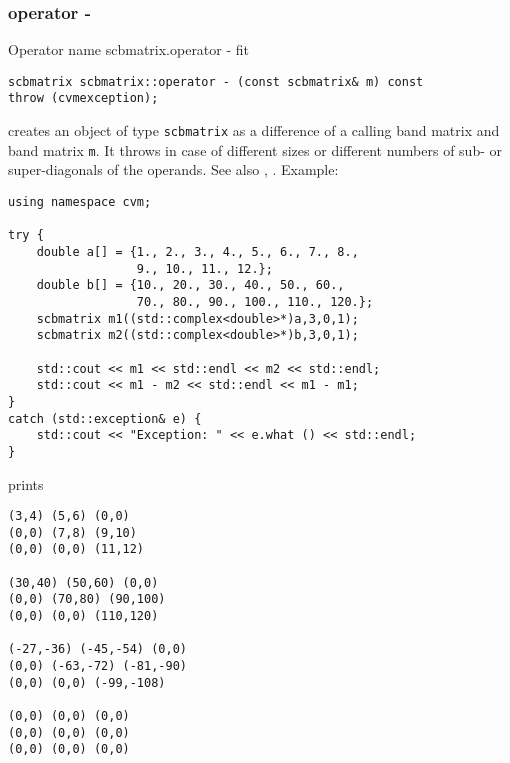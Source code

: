 \subsubsection{operator -}
Operator%
\pdfdest name {scbmatrix.operator -} fit
\begin{verbatim}
scbmatrix scbmatrix::operator - (const scbmatrix& m) const
throw (cvmexception);
\end{verbatim}
creates an object of type \verb"scbmatrix" as a difference of
a calling band matrix and  band matrix \verb"m".
It throws  
in case of different sizes or different numbers of sub- or super-diagonals
of the operands.
See also , .
Example:
\begin{Verbatim}
using namespace cvm;

try {
    double a[] = {1., 2., 3., 4., 5., 6., 7., 8.,
                  9., 10., 11., 12.};
    double b[] = {10., 20., 30., 40., 50., 60., 
                  70., 80., 90., 100., 110., 120.};
    scbmatrix m1((std::complex<double>*)a,3,0,1);
    scbmatrix m2((std::complex<double>*)b,3,0,1);

    std::cout << m1 << std::endl << m2 << std::endl;
    std::cout << m1 - m2 << std::endl << m1 - m1;
}
catch (std::exception& e) {
    std::cout << "Exception: " << e.what () << std::endl;
}
\end{Verbatim}
prints
\begin{Verbatim}
(3,4) (5,6) (0,0)
(0,0) (7,8) (9,10)
(0,0) (0,0) (11,12)

(30,40) (50,60) (0,0)
(0,0) (70,80) (90,100)
(0,0) (0,0) (110,120)

(-27,-36) (-45,-54) (0,0)
(0,0) (-63,-72) (-81,-90)
(0,0) (0,0) (-99,-108)

(0,0) (0,0) (0,0)
(0,0) (0,0) (0,0)
(0,0) (0,0) (0,0)
\end{Verbatim}
\newpage





